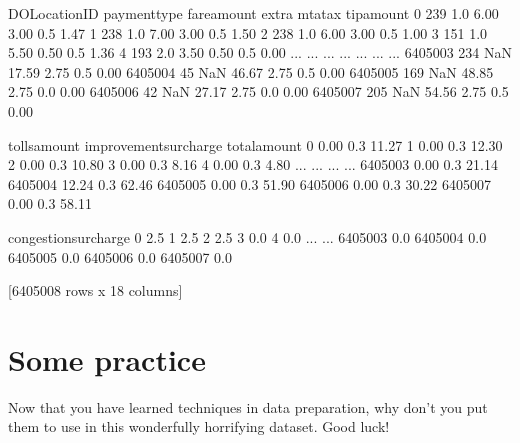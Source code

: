 \documentclass[letterpaper,10pt,english]{jupyterBook}
\begin{document}
\begin{sphinxVerbatim}[commandchars=\\\{\}]
         DOLocationID  payment\PYGZus{}type  fare\PYGZus{}amount  extra  mta\PYGZus{}tax  tip\PYGZus{}amount  \PYGZbs{}
0                 239           1.0         6.00   3.00      0.5        1.47   
1                 238           1.0         7.00   3.00      0.5        1.50   
2                 238           1.0         6.00   3.00      0.5        1.00   
3                 151           1.0         5.50   0.50      0.5        1.36   
4                 193           2.0         3.50   0.50      0.5        0.00   
...               ...           ...          ...    ...      ...         ...   
6405003           234           NaN        17.59   2.75      0.5        0.00   
6405004            45           NaN        46.67   2.75      0.5        0.00   
6405005           169           NaN        48.85   2.75      0.0        0.00   
6405006            42           NaN        27.17   2.75      0.0        0.00   
6405007           205           NaN        54.56   2.75      0.5        0.00   

         tolls\PYGZus{}amount  improvement\PYGZus{}surcharge  total\PYGZus{}amount  \PYGZbs{}
0                0.00                    0.3         11.27   
1                0.00                    0.3         12.30   
2                0.00                    0.3         10.80   
3                0.00                    0.3          8.16   
4                0.00                    0.3          4.80   
...               ...                    ...           ...   
6405003          0.00                    0.3         21.14   
6405004         12.24                    0.3         62.46   
6405005          0.00                    0.3         51.90   
6405006          0.00                    0.3         30.22   
6405007          0.00                    0.3         58.11   

         congestion\PYGZus{}surcharge  
0                         2.5  
1                         2.5  
2                         2.5  
3                         0.0  
4                         0.0  
...                       ...  
6405003                   0.0  
6405004                   0.0  
6405005                   0.0  
6405006                   0.0  
6405007                   0.0  

[6405008 rows x 18 columns]
\end{sphinxVerbatim}


\chapter{Some practice}
\label{\detokenize{c2_data_preparation/some_practice:some-practice}}\label{\detokenize{c2_data_preparation/some_practice::doc}}
\sphinxAtStartPar
Now that you have learned techniques in data preparation, why don’t you put them to use in this wonderfully horrifying dataset. Good luck!
\end{document}
